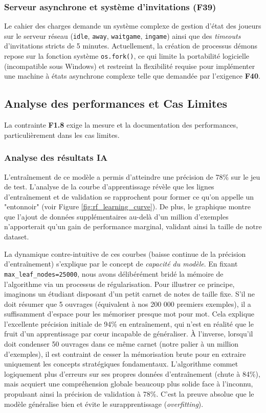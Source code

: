 \documentclass[a4paper]{article}
\begin{document}
\subsubsection{Serveur asynchrone et système d'invitations (F39) \cite{OthelloSpecs2025}}
Le cahier des charges demande un système complexe de gestion d'état des joueurs sur le serveur réseau (\texttt{idle}, \texttt{away}, \texttt{waitgame}, \texttt{ingame}) ainsi que des \textit{timeouts} d'invitations stricts de 5 minutes. Actuellement, la création de processus démons repose sur la fonction système \texttt{os.fork()}, ce qui limite la portabilité logicielle (incompatible sous Windows) et restreint la flexibilité requise pour implémenter une machine à états asynchrone complexe telle que demandée par l'exigence \textbf{F40}.

\subsection{Analyse des performances et Cas Limites}

La contrainte \textbf{F1.8} exige la mesure et la documentation des performances, particulièrement dans les cas limites.

\subsubsection{Analyse des résultats IA}
L'entraînement de ce modèle a permis d'atteindre une précision de 78\% sur le jeu de test. L'analyse de la courbe d'apprentissage révèle que les lignes d'entraînement et de validation se rapprochent pour former ce qu'on appelle un "entonnoir" (voir Figure \ref{fig:rf_learning_curve}). De plus, le graphique montre que l'ajout de données supplémentaires au-delà d'un million d'exemples n'apporterait qu'un gain de performance marginal, validant ainsi la taille de notre dataset.

La dynamique contre-intuitive de ces courbes (baisse continue de la précision d'entraînement) s'explique par le concept de \textit{capacité du modèle}. En fixant \verb|max_leaf_nodes=25000|, nous avons délibérément bridé la mémoire de l'algorithme via un processus de régularisation. Pour illustrer ce principe, imaginons un étudiant disposant d'un petit carnet de notes de taille fixe. S'il ne doit résumer que 5 ouvrages (équivalent à nos 200 000 premiers exemples), il a suffisamment d'espace pour les mémoriser presque mot pour mot. Cela explique l'excellente précision initiale de 94\% en entraînement, qui n'est en réalité que le fruit d'un apprentissage par cœur incapable de généraliser. À l'inverse, lorsqu'il doit condenser 50 ouvrages dans ce même carnet (notre palier à un million d'exemples), il est contraint de cesser la mémorisation brute pour en extraire uniquement les concepts stratégiques fondamentaux. L'algorithme commet logiquement plus d'erreurs sur ses propres données d'entraînement (chute à 84\%), mais acquiert une compréhension globale beaucoup plus solide face à l'inconnu, propulsant ainsi la précision de validation à 78\%. C’est la preuve absolue que le modèle généralise bien et évite le surapprentissage (\textit{overfitting}).
\end{document}
